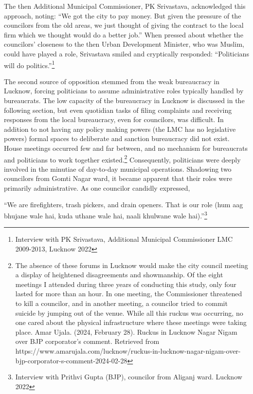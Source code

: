 The then Additional Municipal Commissioner, PK Srivastava, acknowledged this approach, noting: ``We got the city to pay money. But given the pressure of the councilors from the old areas, we just thought of giving the contract to the local firm which we thought would do a better job.'' When pressed about whether the councilors' closeness to the then Urban Development Minister, who was Muslim, could have played a role, Srivastava smiled and cryptically responded: ``Politicians will do politics.''\footnote{Interview with PK Srivastava, Additional Municipal Commissioner LMC 2009-2013, Lucknow 2022}

The second source of opposition stemmed from the weak bureaucracy in Lucknow, forcing politicians to assume administrative roles typically handled by bureaucrats. The low capacity of the bureaucracy in Lucknow is discussed in the following section, but even quotidian tasks of filing complaints and receiving responses from the local bureaucracy, even for councilors, was difficult. In addition to not having any policy making powers (the LMC has no legislative powers) formal spaces to deliberate and sanction bureaucracy did not exist. House meetings occurred few and far between, and no mechanism for bureaucrats and politicians to work together existed.\footnote{The absence of these forums in Lucknow would make the city council meeting a display of heightened disagreements and showmanship. Of the eight meetings I attended during three years of conducting this study, only four lasted for more than an hour. In one meeting, the Commissioner threatened to kill a councilor, and in another meeting, a councilor tried to commit suicide by jumping out of the venue. While all this ruckus was occurring, no one cared about the physical infrastructure where these meetings were taking place. Amar Ujala. (2024, February 28). Ruckus in Lucknow Nagar Nigam over BJP corporator's comment. Retrieved from https://www.amarujala.com/lucknow/ruckus-in-lucknow-nagar-nigam-over-bjp-corporator-s-comment-2024-02-28} Consequently, politicians were deeply involved in the minutiae of day-to-day municipal operations. Shadowing two councilors from Gomti Nagar ward, it became apparent that their roles were primarily administrative. As one councilor candidly expressed,

``We are firefighters, trash pickers, and drain openers. That is our role (hum aag bhujane wale hai, kuda uthane wale hai, naali khulwane wale hai).''\footnote{Interview with Prithvi Gupta (BJP), councilor from Aliganj ward. Lucknow 2022}

